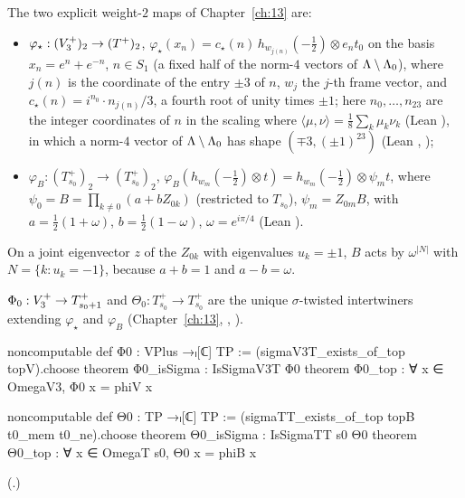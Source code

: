 The two explicit weight-$2$ maps of Chapter~\ref{ch:13} are:
\begin{itemize}
\item $\varphi_\star:(V_3^{+})_2\to(T^+)_2$, $\varphi_\star(x_n)=c_\star(n)\,h_{w_{j(n)}}(-\tfrac12)\otimes e_nt_0$
  on the basis $x_n=e^n+e^{-n}$, $n\in S_1$ (a fixed half of the norm-$4$ vectors of
  ${\Lambda}\setminus{\Lambda}_0$), where $j(n)$ is the coordinate of the entry $\pm3$ of $n$, $w_j$ the $j$-th frame
  vector, and $c_\star(n)=i^{n_0}\cdot n_{j(n)}/3$, a fourth root of unity times $\pm1$; here
  $n_0,\dots,n_{23}$ are the integer coordinates of $n$ in the scaling where
  $\langle\mu,\nu\rangle=\tfrac18\sum_k\mu_k\nu_k$ (Lean ), in which a norm-$4$ vector of
  ${\Lambda}\setminus{\Lambda}_0$ has shape $(\mp3,(\pm1)^{23})$ (Lean ,
  );
\item $\varphi_B:(T_{s_0}^+)_2\to(T_{s_0}^+)_2$, $\varphi_B(h_{w_m}(-\tfrac12)\otimes t)=h_{w_m}(-\tfrac12)\otimes\psi_mt$,
  where $\psi_0=B=\prod_{k\ne0}(a+bZ_{0k})$ (restricted to $T_{s_0}$), $\psi_m=Z_{0m}B$, with
  $a=\tfrac12(1+\omega)$, $b=\tfrac12(1-\omega)$, $\omega=e^{i\pi/4}$ (Lean ).
\end{itemize}
On a joint eigenvector $z$ of the $Z_{0k}$ with eigenvalues $u_k=\pm1$, $B$ acts by $\omega^{|N|}$ with
$N=\{k:u_k=-1\}$, because $a+b=1$ and $a-b=\omega$.

\begin{definition}\label{ch14:def:Phi0}
$\Phi_0:V_3^{+}\to T_{s_0+1}^+$ and $\Theta_0:T_{s_0}^+\to T_{s_0}^+$ are the unique $\sigma$-twisted
intertwiners extending $\varphi_\star$ and $\varphi_B$ (Chapter~\ref{ch:13}, ,
).
\end{definition}
\begin{leancode}
noncomputable def Φ0 : VPlus →ₗ[ℂ] TP := (sigmaV3T_exists_of_top topV).choose
theorem Φ0_isSigma : IsSigmaV3T Φ0
theorem Φ0_top : ∀ x ∈ OmegaV3, Φ0 x = phiV x

noncomputable def Θ0 : TP →ₗ[ℂ] TP := (sigmaTT_exists_of_top topB t0_mem t0_ne).choose
theorem Θ0_isSigma : IsSigmaTT s0 Θ0
theorem Θ0_top : ∀ x ∈ OmegaT s0, Θ0 x = phiB x
\end{leancode}
(.)

